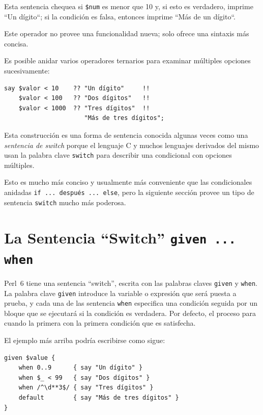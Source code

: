 Esta sentencia chequea si \verb|$num| es menor que 10 y, si esto es verdadero,
imprime ``Un dígito``; si la condición es falsa, entonces imprime ``Más de un dígito``.

Este operador no provee una funcionalidad nueva; solo ofrece una sintaxis
más concisa.

Es posible anidar varios operadores ternarios para examinar múltiples opciones
sucesivamente:

\begin{verbatim}
say $valor < 10    ?? "Un dígito"     !! 
    $valor < 100   ?? "Dos dígitos"   !!
    $valor < 1000  ?? "Tres dígitos"  !!
                      "Más de tres dígitos";
\end{verbatim}

Esta construcción es una forma de sentencia conocida algunas
veces como una \emph{sentencia de switch} porque el lenguaje
C y muchos lenguajes derivados del mismo usan la palabra clave
{\tt switch} para describir una condicional con opciones múltiples.

Esto es mucho más conciso y usualmente más conveniente que las condicionales
anidadas {\tt if ... después ... else}, pero la siguiente sección provee un
tipo de sentencia {\tt switch} mucho más poderosa.

\section{La Sentencia ``Switch'' {\tt given ... when}}
\label{given_when}

Perl~6 tiene una sentencia ``switch'', escrita con las palabras claves 
{\tt given} y {\tt when}. La palabra clave {\tt given} introduce la variable
o expresión que será puesta a prueba, y cada una de las sentencia {\tt when}
especifica una condición seguida por un bloque que se ejecutará si la 
condición es verdadera. Por defecto, el proceso para cuando la primera
con la primera condición que es satisfecha.

El ejemplo más arriba podría escribirse como sigue:

\begin{verbatim}
given $value {
    when 0..9      { say "Un dígito" }
    when $_ < 99   { say "Dos dígitos" }
    when /^\d**3$/ { say "Tres dígitos" }
    default        { say "Más de tres dígitos" }
}
\end{verbatim}

